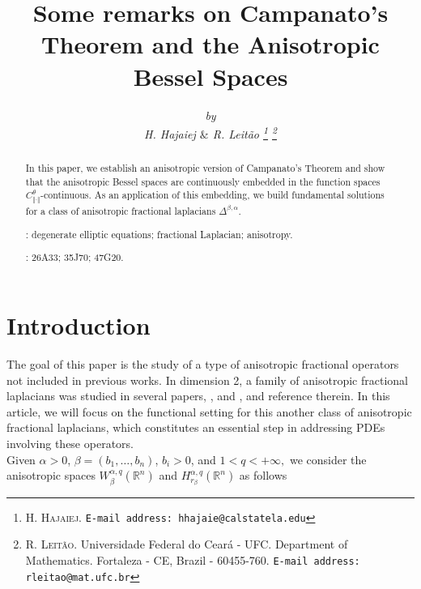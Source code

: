 \documentclass[10pt, leqno]{article}
\title{Some remarks on Campanato's Theorem and the Anisotropic Bessel Spaces}
\author{\it by \smallskip \\
H. Hajaiej \quad $\&$ \quad R. Leit\~ao
    \footnote{ \noindent \textsc{H. Hajaiej}.
\texttt{E-mail address: hhajaie@calstatela.edu}
    }
\footnote{
\noindent \textsc{R. Leit\~ao}.
Universidade Federal do Cear\'{a} - UFC. Department of Mathematics. Fortaleza - CE, Brazil - 60455-760.
\texttt{E-mail address: rleitao@mat.ufc.br}
}
                                                                                           }
\theoremstyle{definition}
\theoremstyle{remark}
\numberwithin{equation}{section}
\begin{document}
\maketitle

\begin{abstract}

In this paper, we establish an anisotropic version of Campanato's Theorem and show that the anisotropic Bessel spaces are continuously embedded in the function spaces $C^{\theta}_{\Vert \cdot \Vert}$-continuous. As an application of this embedding, we build fundamental solutions for a class of anisotropic fractional laplacians $\Delta^{\beta, \alpha}$.
\bigskip

: degenerate elliptic equations; fractional Laplacian; anisotropy.

 : 26A33; 35J70; 47G20.

\tableofcontents

\end{abstract}

\section{Introduction}

The goal of this paper is the study of a type of anisotropic fractional operators not included in previous works. In dimension 2, a family of anisotropic fractional laplacians was studied in several papers, \cite{Hajaiej-EP}, \cite{Hajaiej-SG} and \cite{Hajaiej-KMS}, and reference therein.  In this article, we will focus on the functional setting for this another class of anisotropic fractional laplacians, which constitutes an essential step in addressing PDEs involving these operators.\\

Given $\alpha > 0$, $\beta=\left( b_{1}, \dots, b_{n} \right)$, $b_{i} > 0$, and $1 < q < +\infty,$ we consider the anisotropic spaces $W_{\beta}^{\alpha, q}(\mathbb{R}^{n})$ and $H_{r_{\beta}}^{\alpha, q}(\mathbb{R}^{n})$ as follows
\end{document}
